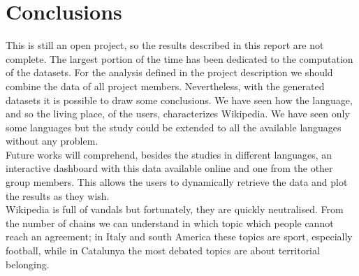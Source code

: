 \chapter{Conclusions}
This is still an open project, so the results described in this report are not complete. The largest
portion of the time has been dedicated to the computation of the datasets. For the analysis defined in the project
description we should combine the data of all project members. Nevertheless, with the generated
datasets it is possible to draw some conclusions. We have seen how the language, and so the living place,
of the users, characterizes Wikipedia. We have seen only some languages but the study could be extended
to all the available languages without any problem.\\

Future works will comprehend, besides the studies in different languages, an interactive dashboard
with this data available online and one from the other group members. This allows the users to
dynamically retrieve the data and plot the results as they wish.\\

Wikipedia is full of vandals but fortunately, they are quickly neutralised. From the number of chains we
can understand in which topic which people cannot reach an agreement; in Italy and south
America these topics are sport, especially football, while in Catalunya the most debated topics are about
territorial belonging.


